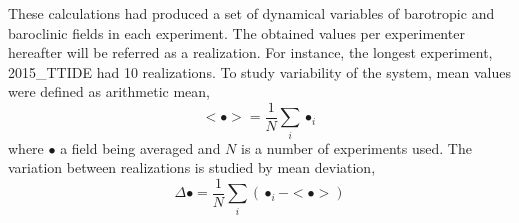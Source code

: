 \documentclass[12pt]{article}
\begin{document}
These calculations had produced a set of dynamical variables of barotropic and baroclinic 
fields in each experiment. The obtained values per experimenter hereafter will be referred as a 
realization. For instance, the longest experiment, 2015\_TTIDE had 10 realizations. To study 
variability of the system, mean values were defined as arithmetic mean,
\begin{equation}
<\bullet> = \frac{1}{N} \sum_i \bullet_i
\end{equation}
where $\bullet$ a field being averaged and $N$ is a number of experiments used. The variation 
between realizations is studied by mean deviation,
\begin{equation}
\Delta \bullet = \frac{1}{N} \sum_i (\bullet_i - <\bullet>)
\end{equation}
\end{document}
